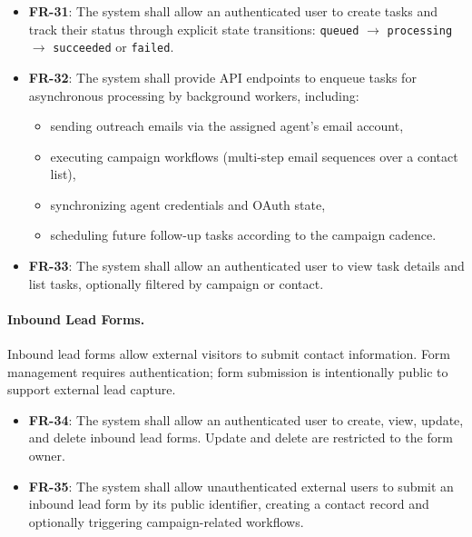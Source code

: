 \begin{itemize}
    \item \textbf{FR-31}: The system shall allow an authenticated user to create tasks and track their status through explicit state transitions: \texttt{queued} $\rightarrow$ \texttt{processing} $\rightarrow$ \texttt{succeeded} or \texttt{failed}.
    \item \textbf{FR-32}: The system shall provide API endpoints to enqueue tasks for asynchronous processing by background workers, including:
    \begin{itemize}
        \item sending outreach emails via the assigned agent's email account,
        \item executing campaign workflows (multi-step email sequences over a contact list),
        \item synchronizing agent credentials and OAuth state,
        \item scheduling future follow-up tasks according to the campaign cadence.
    \end{itemize}
    \item \textbf{FR-33}: The system shall allow an authenticated user to view task details and list tasks, optionally filtered by campaign or contact.
\end{itemize}

\paragraph{Inbound Lead Forms.}
Inbound lead forms allow external visitors to submit contact information. Form management requires authentication; form submission is intentionally public to support external lead capture.

\begin{itemize}
    \item \textbf{FR-34}: The system shall allow an authenticated user to create, view, update, and delete inbound lead forms. Update and delete are restricted to the form owner.
    \item \textbf{FR-35}: The system shall allow unauthenticated external users to submit an inbound lead form by its public identifier, creating a contact record and optionally triggering campaign-related workflows.
\end{itemize}


